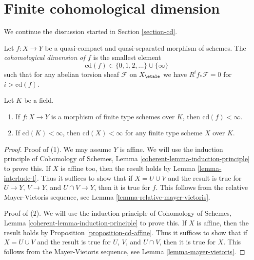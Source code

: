 \section{Finite cohomological dimension}
\label{section-finite-cd}

\noindent
We continue the discussion started in Section \ref{section-cd}.

\begin{definition}
\label{definition-cd-f}
Let $f : X \to Y$ be a quasi-compact and quasi-separated
morphism of schemes.
The {\it cohomological dimension of $f$} is the smallest
element
$$
\text{cd}(f) \in \{0, 1, 2, \ldots\} \cup \{\infty\}
$$
such that for any abelian torsion sheaf $\mathcal{F}$
on $X_\etale$ we have $R^if_*\mathcal{F} = 0$
for $i > \text{cd}(f)$.
\end{definition}

\begin{lemma}
\label{lemma-finite-cd}
Let $K$ be a field.
\begin{enumerate}
\item If $f : X \to Y$ is a morphism of finite type schemes over $K$,
then $\text{cd}(f) < \infty$.
\item If $\text{cd}(K) < \infty$, then $\text{cd}(X) < \infty$
for any finite type scheme $X$ over $K$.
\end{enumerate}
\end{lemma}

\begin{proof}
Proof of (1). We may assume $Y$ is affine. We will use the
induction principle of 
Cohomology of Schemes, Lemma \ref{coherent-lemma-induction-principle}
to prove this. If $X$ is affine too, then the result holds by
Lemma \ref{lemma-interlude-I}. Thus it suffices to show that if
$X = U \cup V$ and the result is true for $U \to Y$, $V \to Y$, and
$U \cap V \to Y$, then it is true for $f$. This follows from the
relative Mayer-Vietoris sequence, see
Lemma \ref{lemma-relative-mayer-vietoris}.

\medskip\noindent
Proof of (2). We will use the induction principle of
Cohomology of Schemes, Lemma \ref{coherent-lemma-induction-principle}
to prove this. If $X$ is affine, then the result holds by
Proposition \ref{proposition-cd-affine}. Thus it suffices to show that if
$X = U \cup V$ and the result is true for $U$, $V$, and
$U \cap V $, then it is true for $X$. This follows from the
Mayer-Vietoris sequence, see
Lemma \ref{lemma-mayer-vietoris}.
\end{proof}


